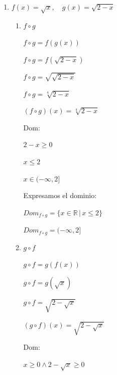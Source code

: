 \documentclass{article}
\begin{document}
\begin{enumerate}
\begin{enumerate}
        \item[d)] \(f(x) = \sqrt{x}, \quad g(x) = \sqrt{2-x}\)
            \begin{enumerate}
                \item[1.] \(f \circ g\)

                \( f \circ g = f(g(x)) \)
                
                \( f \circ g = f\left(\sqrt{2-x}\right) \)
                
                \( f \circ g = \sqrt{\sqrt{2-x}} \)
                
                \( f \circ g = \sqrt[4]{2-x} \)
                \vspace{\baselineskip}
                
                \( (f \circ g)(x) = \sqrt[4]{2-x} \)
                \vspace{\baselineskip}
                
                Dom:
                
                \(2-x \geq 0 \)
                
                \( x \leq 2 \)
                
                \( x \in (-\infty, 2] \)
                \vspace{\baselineskip}

                Expresamos el dominio:
                
                \(Dom_{f \circ g} = \{x \in \mathbb{R} \, | \, x \leq 2\} \)
                
                \(Dom_{f \circ g} = (-\infty, 2] \)
                
                \item[2.] \(g \circ f\)

                \( g \circ f = g(f(x)) \)
                
                \( g \circ f = g\left(\sqrt{x}\right) \)
                
                \( g \circ f = \sqrt{2-\sqrt{x}} \)
                \vspace{\baselineskip}
                
                \( (g \circ f)(x) = \sqrt{2-\sqrt{x}} \)
                \vspace{\baselineskip}
                
                Dom:
                
                \(x \geq 0 \land 2 - \sqrt{x} \geq 0 \)
                

\end{enumerate}
\end{enumerate}
\end{enumerate}
\end{document}
